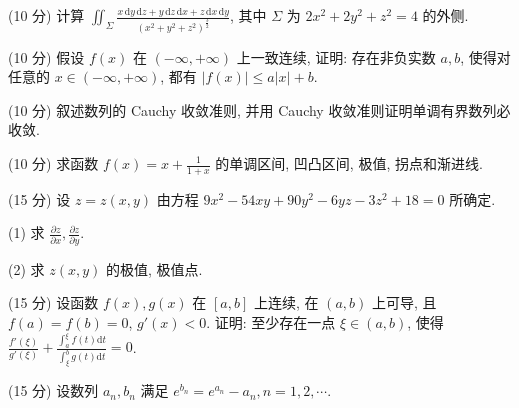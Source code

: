 \par{}
(10 分) 计算 $\iint_{\Sigma} \frac{x \, \mathrm{d}y \, \mathrm{d}z + y \, \mathrm{d}z \, \mathrm{d}x + z \, \mathrm{d}x \, \mathrm{d}y}{(x^2 + y^2 + z^2)^{\frac{3}{2}}}$, 其中 $\Sigma$ 为 $2x^2 + 2y^2 + z^2 = 4$ 的外侧.\par
\par{}
(10 分) 假设 $f(x)$ 在 $(- \infty, + \infty)$ 上一致连续, 证明: 存在非负实数 $a, b$, 使得对任意的 $x \in (-\infty, + \infty)$, 都有 $|f(x)| \leq a|x| + b$.\par
\par{}
(10 分) 叙述数列的 Cauchy 收敛准则, 并用 Cauchy 收敛准则证明单调有界数列必收敛.\par
\par{}
(10 分) 求函数 $f(x) = x + \frac{1}{1 + x}$ 的单调区间, 凹凸区间, 极值, 拐点和渐进线.\par
\par{}
(15 分) 设 $z = z(x, y)$ 由方程 $9x^{2} - 54xy + 90y^{2} - 6yz - 3z^{2} + 18 = 0$ 所确定.\par
(1) 求  $\frac{\partial z}{\partial x}, \frac{\partial z}{\partial y}.$\par
(2) 求  $z(x,y)$  的极值, 极值点.\par
\par{}
(15 分) 设函数 $f(x), g(x)$ 在 $[a, b]$ 上连续, 在 $(a, b)$ 上可导, 且 $f(a) = f(b) = 0$, $g'(x) < 0$. 证明: 至少存在一点 $\xi \in (a, b)$, 使得 $\frac{f'(\xi)}{g'(\xi)} + \frac{\int_a^\xi f(t) \mathrm{d}t}{\int_\xi^b g(t) \mathrm{d}t} = 0$.\par
\par{}
(15 分) 设数列 $a_{n}, b_{n}$ 满足 $e^{b_{n}} = e^{a_{n}} - a_{n}, n = 1, 2, \cdots$.\par
